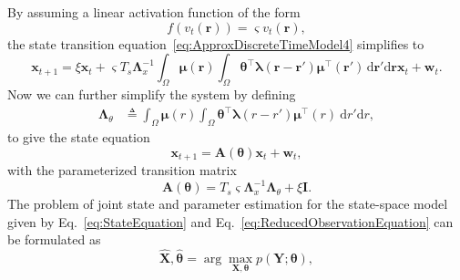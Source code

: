\documentclass[review,authoryear,3p]{elsarticle}
\begin{document}
By assuming a linear activation function of the form
\begin{equation}
	f(v_t(\mathbf{r})) = \varsigma v_t(\mathbf{r}),
\end{equation}
the state transition equation~\eqref{eq:ApproxDiscreteTimeModel4} simplifies to
\begin{equation}\label{eq:ApproxDiscreteTimeModel_Linear}
	\mathbf{x}_{t+1} = 
	\xi \mathbf{x}_t + 
	\varsigma T_s \mathbf{\Lambda}_{x}^{-1} \int_{\Omega}\boldsymbol\mu\left(\mathbf{r}\right)\int_\Omega { 
	    \boldsymbol\theta^\top\boldsymbol\lambda\left(\mathbf{r}-\mathbf{r}'\right)
	    \boldsymbol\mu^\top\left(\mathbf{r}'\right) 
	\, \mathrm{d}\mathbf{r}'\mathrm{d}\mathbf{r}} \mathbf{x}_t
	+ \mathbf{w}_t.
\end{equation}
Now we can further simplify the system by defining
\begin{align}
	\label{eq:Lambdatheta}
	 \mathbf{\Lambda}_{\theta} &\triangleq \int_{\Omega}\boldsymbol\mu\left(r\right) \int_\Omega { 
		   \boldsymbol\theta^\top\boldsymbol\lambda\left(r-r'\right)
		    \boldsymbol\mu^\top\left(r\right)\ \mathrm{d}r'\mathrm{d}r},
\end{align}
to give the state equation
\begin{equation}\label{eq:StateEquation}
 \mathbf x_{t+1} =\mathbf A(\boldsymbol \theta) \mathbf x_t+ \mathbf w_t,
\end{equation} 
with the parameterized transition matrix
\begin{equation}\label{eq:A_theta}
 \mathbf A(\boldsymbol \theta)= T_s\varsigma\mathbf{\Lambda}_{x}^{-1}\mathbf{\Lambda}_{\theta}+\xi\mathbf I.
\end{equation} 
The problem of joint state and parameter estimation for the state-space model given by Eq.~\eqref{eq:StateEquation} and Eq.~\eqref{eq:ReducedObservationEquation} can be formulated as 
\begin{equation}
	{\hat{\mathbf X},\hat{\boldsymbol\theta}}=\arg\max_{\mathbf X,\boldsymbol\theta}p(\mathbf Y;\boldsymbol\theta),
 \end{equation}  
\end{document}
